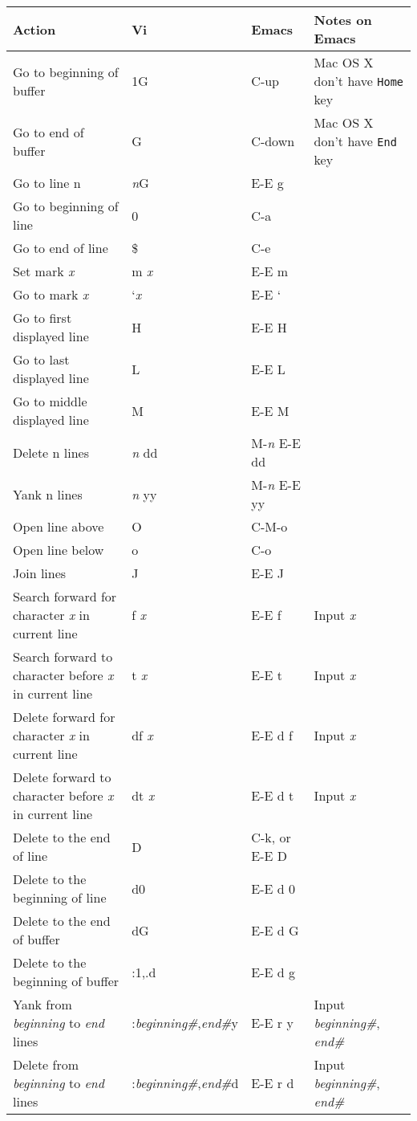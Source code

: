 \begin{table}[htbp]
\begin{minipage}{\linewidth}
\setlength{\tymax}{0.5\linewidth}
\centering
\small
\begin{tabulary}{\textwidth}{@{}LLLL@{}} \toprule
Action&Vi&Emacs&Notes on Emacs\\
\midrule
Go to beginning of buffer&1G&C-up&Mac OS X don't have \texttt{Home} key\\
Go to end of buffer&G&C-down&Mac OS X don't have \texttt{End} key\\
Go to line n&\emph{n}G&E-E g&\\
Go to beginning of line&0&C-a&\\
Go to end of line&\$&C-e&\\
Set mark \emph{x}&m \emph{x}&E-E m&\\
Go to mark \emph{x}&`\emph{x}&E-E `&\\
Go to first displayed line&H&E-E H&\\
Go to last displayed line&L&E-E L&\\
Go to middle displayed line&M&E-E M&\\
Delete n lines&\emph{n} dd&M-\emph{n} E-E dd&\\
Yank n lines&\emph{n} yy&M-\emph{n} E-E yy&\\
Open line above&O&C-M-o&\\
Open line below&o&C-o&\\
Join lines&J&E-E J&\\
Search forward for character \emph{x} in current line&f \emph{x}&E-E f&Input \emph{x}\\
Search forward to character before \emph{x} in current line&t \emph{x}&E-E t&Input \emph{x}\\
Delete forward for character \emph{x} in current line&df \emph{x}&E-E d f&Input \emph{x}\\
Delete forward to character before \emph{x} in current line&dt \emph{x}&E-E d t&Input \emph{x}\\
Delete to the end of line&D&C-k, or E-E D&\\
Delete to the beginning of line&d0&E-E d 0&\\
Delete to the end of buffer&dG&E-E d G&\\
Delete to the beginning of buffer&:1,.d&E-E d g&\\
Yank from \emph{beginning} to \emph{end} lines&:\emph{beginning\#},\emph{end\#}y&E-E r y&Input \emph{beginning\#}, \emph{end\#}\\
Delete from \emph{beginning} to \emph{end} lines&:\emph{beginning\#},\emph{end\#}d&E-E r d&Input \emph{beginning\#}, \emph{end\#}\\

\end{tabulary}
\end{minipage}
\end{table}
